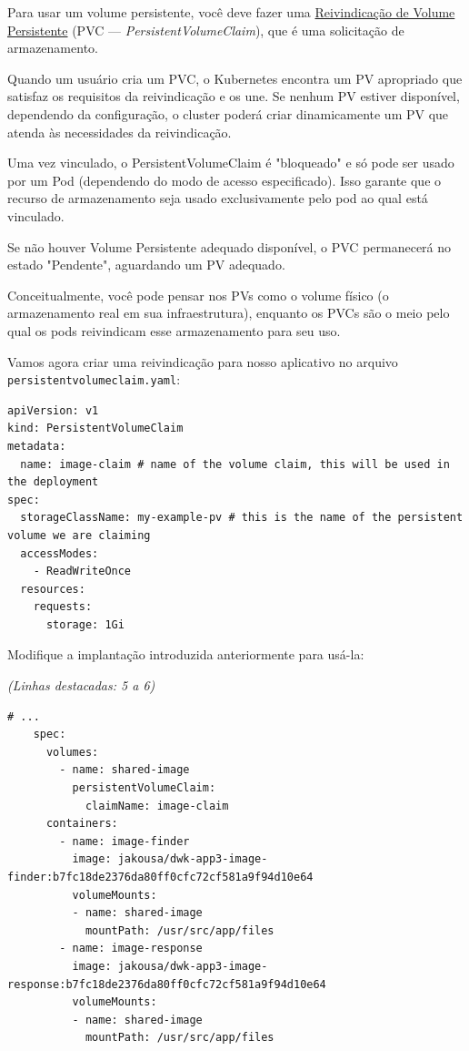 \documentclass[11pt,a4paper]{article}
\begin{document}
Para usar um volume persistente, você deve fazer uma \href{https://kubernetes.io/docs/concepts/storage/persistent-volumes/}{Reivindicação de Volume Persistente} (PVC --- \textit{PersistentVolumeClaim}), que é uma solicitação de armazenamento.

Quando um usuário cria um PVC, o Kubernetes encontra um PV apropriado que satisfaz os requisitos da reivindicação e os une. Se nenhum PV estiver disponível, dependendo da configuração, o cluster poderá criar dinamicamente um PV que atenda às necessidades da reivindicação.

Uma vez vinculado, o PersistentVolumeClaim é "bloqueado" e só pode ser usado por um Pod (dependendo do modo de acesso especificado). Isso garante que o recurso de armazenamento seja usado exclusivamente pelo pod ao qual está vinculado.

Se não houver Volume Persistente adequado disponível, o PVC permanecerá no estado "Pendente", aguardando um PV adequado.

Conceitualmente, você pode pensar nos PVs como o volume físico (o armazenamento real em sua infraestrutura), enquanto os PVCs são o meio pelo qual os pods reivindicam esse armazenamento para seu uso.

Vamos agora criar uma reivindicação para nosso aplicativo no arquivo \texttt{persistentvolumeclaim.yaml}:

\begin{verbatim}
apiVersion: v1
kind: PersistentVolumeClaim
metadata:
  name: image-claim # name of the volume claim, this will be used in the deployment
spec:
  storageClassName: my-example-pv # this is the name of the persistent volume we are claiming
  accessModes:
    - ReadWriteOnce
  resources:
    requests:
      storage: 1Gi
\end{verbatim}

Modifique a implantação introduzida anteriormente para usá-la:

\textit{(Linhas destacadas: 5 a 6)}

\begin{verbatim}
# ...
    spec:
      volumes:
        - name: shared-image
          persistentVolumeClaim:
            claimName: image-claim
      containers:
        - name: image-finder
          image: jakousa/dwk-app3-image-finder:b7fc18de2376da80ff0cfc72cf581a9f94d10e64
          volumeMounts:
          - name: shared-image
            mountPath: /usr/src/app/files
        - name: image-response
          image: jakousa/dwk-app3-image-response:b7fc18de2376da80ff0cfc72cf581a9f94d10e64
          volumeMounts:
          - name: shared-image
            mountPath: /usr/src/app/files
\end{verbatim}
\end{document}
